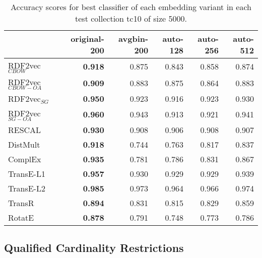 \documentclass[11pt,titlepage,oneside,openany]{book}
\begin{document}
\begin{table}[h!]
\centering
\begin{tabular}{lrrrrr}
\toprule
{} &  original-200 &  avgbin-200 &  auto-128 &  auto-256 &  auto-512 \\
\midrule
RDF2vec$_{CBOW}$     &	\textbf{0.918} &       0.875  &     0.843  &     0.858  &     0.874  \\
RDF2vec$_{CBOW-OA}$  &	\textbf{0.909} &       0.883  &     0.875  &     0.864  &     0.883  \\
RDF2vec$_{SG}$       &	\textbf{0.950} &       0.923  &     0.916  &     0.923  &     0.930  \\
RDF2vec$_{SG-OA}$    &	\textbf{0.960} &       0.943  &     0.913  &     0.921  &     0.941  \\
RESCAL               &	\textbf{0.930} &       0.908  &     0.906  &     0.908  &     0.907  \\
DistMult             &	\textbf{0.918} &       0.744  &     0.763  &     0.817  &     0.837  \\
ComplEx              &	\textbf{0.935} &       0.781  &     0.786  &     0.831  &     0.867  \\
TransE-L1            &	\textbf{0.957} &       0.930  &     0.929  &     0.929  &     0.939  \\
TransE-L2            &	\textbf{0.985} &       0.973  &     0.964  &     0.966  &     0.974  \\
TransR               &	\textbf{0.894} &       0.831  &     0.815  &     0.829  &     0.859  \\
RotatE               &	\textbf{0.878} &       0.791  &     0.748  &     0.773  &     0.786  \\
\bottomrule
\end{tabular}
\caption{Accuracy scores for best classifier of each embedding variant in each test collection tc10 of size 5000.}
\label{tab:dlcc-acc-tc10-5000}
\end{table}

\newpage

\subsection{Qualified Cardinality Restrictions}
\label{subsec:dlcc-results-tc11-tc12}
\end{document}
